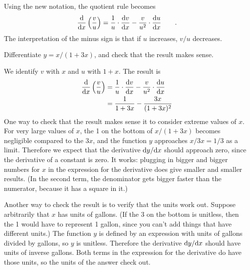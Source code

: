 Using the new notation, the quotient rule becomes
\begin{equation*}
  \frac{\textup{d}}{\textup{d} x} \left(\frac{v}{u}\right) = \frac{1}{u}\cdot\frac{\textup{d} v}{\textup{d} x} - \frac{v}{u^2} \cdot \frac{\textup{d} u}{\textup{d} x} \qquad .
\end{equation*}
The interpretation of the minus sign is that if $u$ increases, $v/u$ decreases.

\begin{eg}
\egquestion Differentiate $y=x/(1+3x)$, and check that the result makes sense.

\eganswer We identify $v$ with $x$ and $u$ with $1+x$. The result is
\begin{align*}
  \frac{\textup{d}}{\textup{d} x} \left(\frac{v}{u}\right) &= \frac{1}{u}\cdot\frac{\textup{d} v}{\textup{d} x} - \frac{v}{u^2} \cdot \frac{\textup{d} u}{\textup{d} x} \\
            &= \frac{1}{1+3x} - \frac{3x}{(1+3x)^2}
\end{align*}
One way to check that the result makes sense it to consider extreme values of $x$. For very large values of $x$, the
1 on the bottom of $x/(1+3x)$ becomes negligible compared to the $3x$, and the function $y$ approaches $x/3x=1/3$ as a limit.
Therefore we expect that the derivative $\textup{d} y/\textup{d} x$ should approach zero, since the derivative of a constant is
zero. It works: plugging in bigger and bigger numbers for $x$ in the expression for the derivative does give
smaller and smaller results. (In the second term, the denominator gets bigger faster than the numerator, because
it has a square in it.)

Another way to check the result is to verify that the units work out. Suppose arbitrarily that $x$ has units of gallons.
(If the 3 on the bottom is unitless, then the 1 would have to represent 1 gallon, since you can't add things that have
different units.) The function $y$ is defined by an expression with units of gallons divided by gallons, so $y$ is
unitless. Therefore the derivative $\textup{d} y/\textup{d} x$ should have units of inverse gallons. Both terms in the
expression for the derivative do have those units, so the units of the answer check out.
\end{eg}

